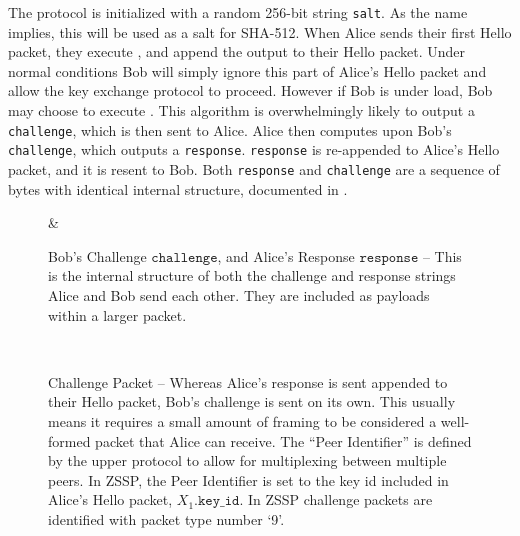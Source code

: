 \documentclass{article}
\begin{document}
The protocol is initialized with a random 256-bit string \texttt{salt}. As the name implies, this will be used as a salt for SHA-512. When Alice sends their first Hello packet, they execute , and append the output to their Hello packet. Under normal conditions Bob will simply ignore this part of Alice's Hello packet and allow the key exchange protocol to proceed. However if Bob is under load, Bob may choose to execute . This algorithm is overwhelmingly likely to output a \texttt{challenge}, which is then sent to Alice. Alice then computes  upon Bob's \texttt{challenge}, which outputs a \texttt{response}. \texttt{response} is re-appended to Alice's Hello packet, and it is resent to Bob. Both \texttt{response} and \texttt{challenge} are a sequence of bytes with identical internal structure, documented in .

\begin{figure}
	\caption{Bob's Challenge $\texttt{challenge}$, and Alice's Response $\texttt{response}$ -- This is the internal structure of both the challenge and response strings Alice and Bob send each other. They are included as payloads within a larger packet.}\label{packet:challenge_internal}
	\centering
	\begin{bytefield}[bitwidth=6.5em]{4}
		 &  \\
	\end{bytefield}
\end{figure}

\begin{figure}
	\caption{Challenge Packet -- Whereas Alice's response is sent appended to their Hello packet, Bob's challenge is sent on its own. This usually means it requires a small amount of framing to be considered a well-formed packet that Alice can receive. The ``Peer Identifier'' is defined by the upper protocol to allow for multiplexing between multiple peers. In ZSSP, the Peer Identifier is set to the key id included in Alice's Hello packet, $X_1\texttt{.key\_id}$. In ZSSP challenge packets are identified with packet type number `9'.}\label{packet:challenge}
	\centering
	\begin{bytefield}[bitwidth=6em]{4}
		 \\
	\end{bytefield}
\end{figure}
\end{document}
